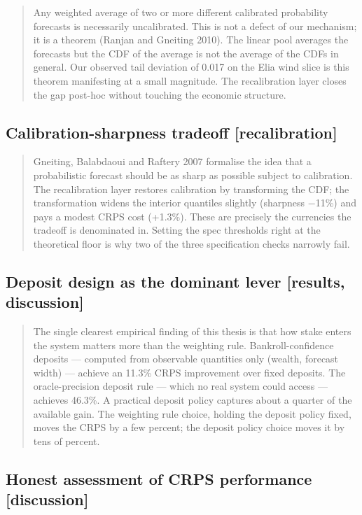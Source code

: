\documentclass[11pt,a4paper,openany]{report}
\begin{document}
\begin{quote}
Any weighted average of two or more different calibrated probability
forecasts is necessarily uncalibrated. This is not a defect of our
mechanism; it is a theorem (Ranjan and Gneiting 2010). The linear
pool averages the forecasts but the CDF of the average is not the
average of the CDFs in general. Our observed tail deviation of 0.017
on the Elia wind slice is this theorem manifesting at a small
magnitude. The recalibration layer closes the gap post-hoc without
touching the economic structure.

\end{quote}
\subsection{Calibration-sharpness tradeoff [recalibration]}

\begin{quote}
Gneiting, Balabdaoui and Raftery 2007 formalise the idea that a
probabilistic forecast should be as sharp as possible subject to
calibration. The recalibration layer restores calibration by
transforming the CDF; the transformation widens the interior
quantiles slightly (sharpness −11\%) and pays a modest CRPS cost
(+1.3\%). These are precisely the currencies the tradeoff is
denominated in. Setting the spec thresholds right at the theoretical
floor is why two of the three specification checks narrowly fail.

\end{quote}
\subsection{Deposit design as the dominant lever [results, discussion]}

\begin{quote}
The single clearest empirical finding of this thesis is that how
stake enters the system matters more than the weighting rule.
Bankroll-confidence deposits — computed from observable quantities
only (wealth, forecast width) — achieve an 11.3\% CRPS improvement
over fixed deposits. The oracle-precision deposit rule — which no
real system could access — achieves 46.3\%. A practical deposit
policy captures about a quarter of the available gain. The
weighting rule choice, holding the deposit policy fixed, moves the
CRPS by a few percent; the deposit policy choice moves it by tens of
percent.

\end{quote}
\subsection{Honest assessment of CRPS performance [discussion]}
\end{document}
